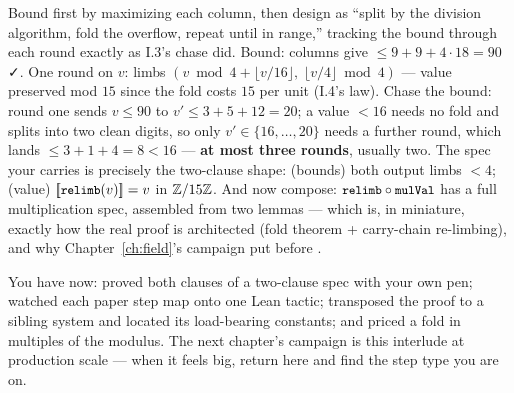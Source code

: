 \pathway Bound  first by maximizing each column, then
design  as ``split by the division algorithm, fold the
overflow, repeat until in range,'' tracking the bound through each
round exactly as I.3's chase did.
\answer Bound: columns give $\le 9 + 9 + 4 \cdot 18 = 90$ ✓. One
 round on $v$: limbs $(v \bmod 4 + \lfloor v/16 \rfloor,\;
\lfloor v/4 \rfloor \bmod 4)$ --- value preserved mod $15$ since the
fold costs $15$ per unit (I.4's law). Chase the bound: round one sends
$v \le 90$ to $v' \le 3 + 5 + 12 = 20$; a value $< 16$ needs no fold
and splits into two clean digits, so only $v' \in \{16, \dots, 20\}$
needs a further round, which lands $\le 3 + 1 + 4 = 8 < 16$ ---
\textbf{at most three rounds}, usually two. The spec your 
carries is precisely the two-clause shape: (bounds) both output limbs
$< 4$; (value) $\denote{\code{relimb}(v)} = v$ in $\mathbb{Z}/15\mathbb{Z}$. And now
compose: $\code{relimb} \circ \code{mulVal}$ has a full multiplication
spec, assembled from two lemmas --- which is, in miniature, exactly how
the real  proof is architected (fold theorem + carry-chain
re-limbing), and why Chapter~\ref{ch:field}'s campaign put
 before .

\begin{checkpoint}
You have now: proved both clauses of a two-clause spec with your own
pen; watched each paper step map onto one Lean tactic; transposed the
proof to a sibling system and located its load-bearing constants; and
priced a fold in multiples of the modulus. The next chapter's campaign
is this interlude at production scale --- when it feels big, return
here and find the step type you are on.
\end{checkpoint}
